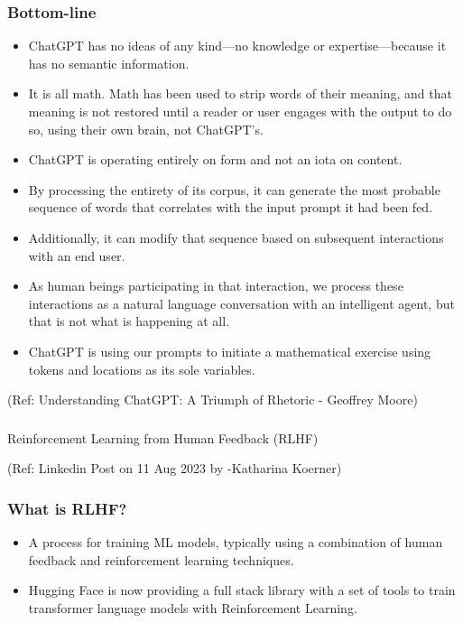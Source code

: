 \begin{frame}[fragile]\frametitle{Bottom-line}

\begin{itemize}
\item ChatGPT has no ideas of any kind—no knowledge or expertise—because it has no semantic information. 
\item It is all math. Math has been used to strip words of their meaning, and that meaning is not restored until a reader or user engages with the output to do so, using their own brain, not ChatGPT’s. 
\item ChatGPT is operating entirely on form and not an iota on content. 
\item By processing the entirety of its corpus, it can generate the most probable sequence of words that correlates with the input prompt it had been fed. 
\item Additionally, it can modify that sequence based on subsequent interactions with an end user. 
\item As human beings participating in that interaction, we process these interactions as a natural language conversation with an intelligent agent, but that is not what is happening at all. 
\item ChatGPT is using our prompts to initiate a mathematical exercise using tokens and locations as its sole variables. 
\end{itemize}


{\tiny (Ref: Understanding ChatGPT: A Triumph of Rhetoric - Geoffrey Moore)}

\end{frame}

\begin{frame}[fragile]\frametitle{}
\begin{center}
{\Large Reinforcement Learning from Human Feedback (RLHF)}

{\tiny (Ref: Linkedin Post on 11 Aug 2023 by -Katharina Koerner)}

\end{center}
\end{frame}

\begin{frame}[fragile]\frametitle{What is RLHF?}

\begin{itemize}
\item  A process for training ML models, typically using a combination of human feedback and reinforcement learning techniques.
\item Hugging Face is now providing a full stack library with a set of tools to train transformer language models with Reinforcement Learning. 
\end{itemize}

\end{frame}


